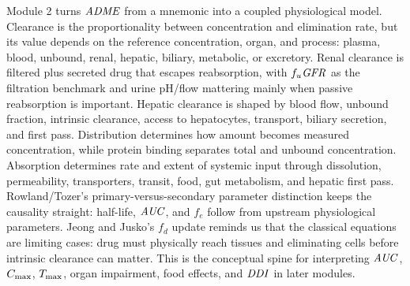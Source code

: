 \documentclass[a4paper]{article}
\newcommand{\AUC}{\ensuremath{\pksym{AUC}}}
\newcommand{\Cmax}{\ensuremath{C_{\pklab{max}}}}
\newcommand{\Tmax}{\ensuremath{T_{\pklab{max}}}}
\newcommand{\fu}{\ensuremath{f_u}}
\newcommand{\fd}{\ensuremath{f_d}}
\newcommand{\GFR}{\ensuremath{\pksym{GFR}}}
\newcommand{\ADME}{\ensuremath{\pksym{ADME}}}
\newcommand{\DDI}{\ensuremath{\pksym{DDI}}}
\begin{document}
Module 2 turns \ADME{} from a mnemonic into a coupled physiological model. Clearance is the proportionality between concentration and elimination rate, but its value depends on the reference concentration, organ, and process: plasma, blood, unbound, renal, hepatic, biliary, metabolic, or excretory. Renal clearance is filtered plus secreted drug that escapes reabsorption, with \(\fu\GFR\) as the filtration benchmark and urine pH/flow mattering mainly when passive reabsorption is important. Hepatic clearance is shaped by blood flow, unbound fraction, intrinsic clearance, access to hepatocytes, transport, biliary secretion, and first pass. Distribution determines how amount becomes measured concentration, while protein binding separates total and unbound concentration. Absorption determines rate and extent of systemic input through dissolution, permeability, transporters, transit, food, gut metabolism, and hepatic first pass. Rowland/Tozer's primary-versus-secondary parameter distinction keeps the causality straight: half-life, \(\AUC\), and \(f_e\) follow from upstream physiological parameters. Jeong and Jusko's \(\fd\) update reminds us that the classical equations are limiting cases: drug must physically reach tissues and eliminating cells before intrinsic clearance can matter. This is the conceptual spine for interpreting \(\AUC\), \(\Cmax\), \(\Tmax\), organ impairment, food effects, and \DDI{} in later modules.



\end{document}
